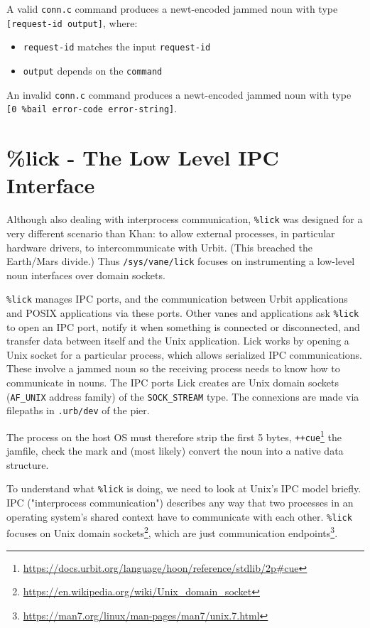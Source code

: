 \documentclass[twoside]{article}
\begin{document}
A valid \texttt{conn.c} command produces a newt-encoded jammed noun with type \texttt{[request-id output]}, where:
\begin{itemize}
  \item \texttt{request-id} matches the input \texttt{request-id}
  \item \texttt{output} depends on the \texttt{command}
\end{itemize}

An invalid \texttt{conn.c} command produces a newt-encoded jammed noun with type \texttt{[0 \%bail error-code error-string]}. 

\section{\%lick - The Low Level IPC Interface}

Although also dealing with interprocess communication, \texttt{\%lick} \citep{UIP-101} was designed for a very different scenario than Khan:  to allow external processes, in particular hardware drivers, to intercommunicate with Urbit.  (This breached the Earth/Mars divide.)  Thus \texttt{/sys/vane/lick} focuses on instrumenting a low-level noun interfaces over domain sockets.

\texttt{\%lick} manages IPC ports, and the communication between Urbit applications and POSIX applications via these ports. Other vanes and applications ask \texttt{\%lick} to open an IPC port, notify it when something is connected or disconnected, and transfer data between itself and the Unix application.
Lick works by opening a Unix socket for a particular process, which allows serialized IPC communications.  These involve a jammed noun so the receiving process needs to know how to communicate in nouns.
The IPC ports Lick creates are Unix domain sockets (\texttt{AF\_UNIX} address family) of the \texttt{SOCK\_STREAM} type.
The connexions are made via filepaths in \texttt{.urb/dev} of the pier.

The process on the host OS must therefore strip the first 5 bytes, \texttt{++cue}\footnote{\url{https://docs.urbit.org/language/hoon/reference/stdlib/2p#cue}} the jamfile, check the mark and (most likely) convert the noun into a native data structure.

To understand what \texttt{\%lick} is doing, we need to look at Unix's IPC model briefly.  IPC ("interprocess communication") describes any way that two processes in an operating system's shared context have to communicate with each other.  \texttt{\%lick} focuses on Unix domain sockets\footnote{\url{https://en.wikipedia.org/wiki/Unix_domain_socket}}, which are just communication endpoints\footnote{\url{https://man7.org/linux/man-pages/man7/unix.7.html}}.
\end{document}
